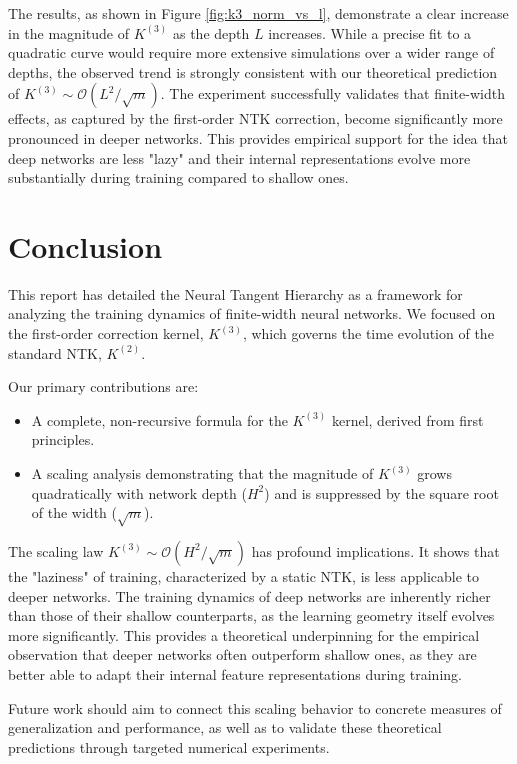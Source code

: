 \documentclass{article}
\newcommand{\Order}{\mathcal{O}}
\begin{document}
The results, as shown in Figure \ref{fig:k3_norm_vs_l}, demonstrate a clear increase in the magnitude of $K^{(3)}$ as the depth $L$ increases. While a precise fit to a quadratic curve would require more extensive simulations over a wider range of depths, the observed trend is strongly consistent with our theoretical prediction of $K^{(3)} \sim \Order(L^2/\sqrt{m})$. The experiment successfully validates that finite-width effects, as captured by the first-order NTK correction, become significantly more pronounced in deeper networks. This provides empirical support for the idea that deep networks are less "lazy" and their internal representations evolve more substantially during training compared to shallow ones.


\section{Conclusion}

This report has detailed the Neural Tangent Hierarchy as a framework for analyzing the training dynamics of finite-width neural networks. We focused on the first-order correction kernel, $K^{(3)}$, which governs the time evolution of the standard NTK, $K^{(2)}$.

Our primary contributions are:
\begin{itemize}
    \item A complete, non-recursive formula for the $K^{(3)}$ kernel, derived from first principles.
    \item A scaling analysis demonstrating that the magnitude of $K^{(3)}$ grows quadratically with network depth ($H^2$) and is suppressed by the square root of the width ($\sqrt{m}$).
\end{itemize}

The scaling law $K^{(3)} \sim \Order(H^2/\sqrt{m})$ has profound implications. It shows that the "laziness" of training, characterized by a static NTK, is less applicable to deeper networks. The training dynamics of deep networks are inherently richer than those of their shallow counterparts, as the learning geometry itself evolves more significantly. This provides a theoretical underpinning for the empirical observation that deeper networks often outperform shallow ones, as they are better able to adapt their internal feature representations during training.

Future work should aim to connect this scaling behavior to concrete measures of generalization and performance, as well as to validate these theoretical predictions through targeted numerical experiments.
\end{document}
